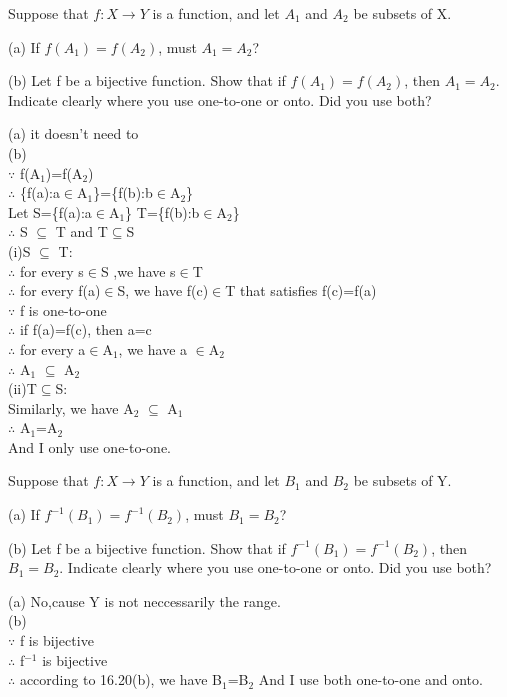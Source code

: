 \documentclass[11pt, a4paper, UTF8]{ctexart}
\begin{document}
\begin{problem}[UD:16.20]
Suppose that \(f: X \rightarrow Y\) is a function, and let \(A_{1}\) and \(A_{2}\) be subsets of X.

(a) If \(f(A_{1}) = f(A_{2})\), must \(A_{1} = A_{2}\)?

(b) Let f be a bijective function. Show that if \(f(A_{1}) = f(A_{2})\), then \(A_{1} = A_{2}\). Indicate clearly where you use one-to-one or onto. Did you use both?
\end{problem}
\begin{solution}
(a) it doesn't need to\\
(b) \\
$\because$ f(A$_1$)=f(A$_2$)\\
$\therefore$ \{f(a):a$\in$A$_1$\}=\{f(b):b$\in$A$_2$\}\\
Let S=\{f(a):a$\in$A$_1$\} T=\{f(b):b$\in$A$_2$\}\\
$\therefore$ S $\subseteq$ T and T$\subseteq$S\\
(i)S $\subseteq$ T:\\
$\therefore$ for every s$\in$S ,we have s$\in$T\\
$\therefore$ for every f(a)$\in$S, we have f(c)$\in$T that satisfies f(c)=f(a)\\
$\because$ f is one-to-one\\
$\therefore$ if f(a)=f(c), then a=c\\
$\therefore$ for every a$\in$A$_1$, we have a $\in$A$_2$\\
$\therefore$ A$_1$ $\subseteq$ A$_2$\\
(ii)T$\subseteq$S:\\
Similarly, we have A$_2$ $\subseteq$ A$_1$\\
$\therefore$ A$_1$=A$_2$\\
And I only use one-to-one.
\end{solution}


\begin{problem}[UD:16.21]
Suppose that \(f: X \rightarrow Y\) is a function, and let \(B_{1}\) and \(B_{2}\) be subsets of Y.

(a) If \(f^{-1}(B_{1}) = f^{-1}(B_{2})\), must \(B_{1} = B_{2}\)?

(b) Let f be a bijective function. Show that if \(f^{-1}(B_{1}) = f^{-1}(B_{2})\), then \(B_{1} = B_{2}\). Indicate clearly where you use one-to-one or onto. Did you use both?
\end{problem}
\begin{solution}
(a) No,cause Y is not neccessarily the range.\\
(b)\\
$\because$ f is bijective\\
$\therefore$ f$^{-1}$ is bijective\\
$\therefore$ according to 16.20(b), we have B$_1$=B$_2$
And I use both one-to-one and onto.
\end{solution}
\end{document}
